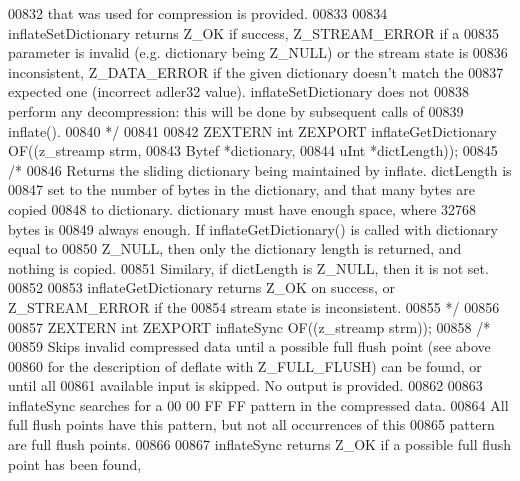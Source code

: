 \begin{DoxyCode}
00832 \textcolor{comment}{   that was used for compression is provided.}
00833 \textcolor{comment}{}
00834 \textcolor{comment}{     inflateSetDictionary returns Z\_OK if success, Z\_STREAM\_ERROR if a}
00835 \textcolor{comment}{   parameter is invalid (e.g.  dictionary being Z\_NULL) or the stream state is}
00836 \textcolor{comment}{   inconsistent, Z\_DATA\_ERROR if the given dictionary doesn't match the}
00837 \textcolor{comment}{   expected one (incorrect adler32 value).  inflateSetDictionary does not}
00838 \textcolor{comment}{   perform any decompression: this will be done by subsequent calls of}
00839 \textcolor{comment}{   inflate().}
00840 \textcolor{comment}{*/}
00841 
00842 ZEXTERN \textcolor{keywordtype}{int} ZEXPORT inflateGetDictionary OF((z\_streamp strm,
00843                                              Bytef *dictionary,
00844                                              uInt  *dictLength));
00845 \textcolor{comment}{/*}
00846 \textcolor{comment}{     Returns the sliding dictionary being maintained by inflate.  dictLength is}
00847 \textcolor{comment}{   set to the number of bytes in the dictionary, and that many bytes are copied}
00848 \textcolor{comment}{   to dictionary.  dictionary must have enough space, where 32768 bytes is}
00849 \textcolor{comment}{   always enough.  If inflateGetDictionary() is called with dictionary equal to}
00850 \textcolor{comment}{   Z\_NULL, then only the dictionary length is returned, and nothing is copied.}
00851 \textcolor{comment}{   Similary, if dictLength is Z\_NULL, then it is not set.}
00852 \textcolor{comment}{}
00853 \textcolor{comment}{     inflateGetDictionary returns Z\_OK on success, or Z\_STREAM\_ERROR if the}
00854 \textcolor{comment}{   stream state is inconsistent.}
00855 \textcolor{comment}{*/}
00856 
00857 ZEXTERN \textcolor{keywordtype}{int} ZEXPORT inflateSync OF((z\_streamp strm));
00858 \textcolor{comment}{/*}
00859 \textcolor{comment}{     Skips invalid compressed data until a possible full flush point (see above}
00860 \textcolor{comment}{   for the description of deflate with Z\_FULL\_FLUSH) can be found, or until all}
00861 \textcolor{comment}{   available input is skipped.  No output is provided.}
00862 \textcolor{comment}{}
00863 \textcolor{comment}{     inflateSync searches for a 00 00 FF FF pattern in the compressed data.}
00864 \textcolor{comment}{   All full flush points have this pattern, but not all occurrences of this}
00865 \textcolor{comment}{   pattern are full flush points.}
00866 \textcolor{comment}{}
00867 \textcolor{comment}{     inflateSync returns Z\_OK if a possible full flush point has been found,}

\end{DoxyCode}
